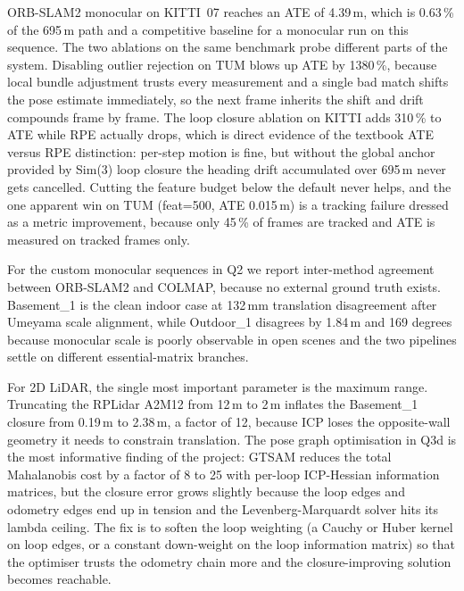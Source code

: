 \documentclass[twocolumn,10pt,a4paper]{article}
\begin{document}
ORB-SLAM2 monocular on KITTI~07 reaches an ATE of 4.39\,m, which is
0.63\,\% of the 695\,m path and a competitive baseline for a
monocular run on this sequence. The two ablations on the same
benchmark probe different parts of the system. Disabling outlier
rejection on TUM blows up ATE by 1380\,\%, because local bundle
adjustment trusts every measurement and a single bad match shifts
the pose estimate immediately, so the next frame inherits the shift
and drift compounds frame by frame. The loop closure ablation on
KITTI adds 310\,\% to ATE while RPE actually drops, which is direct
evidence of the textbook ATE versus RPE distinction: per-step motion
is fine, but without the global anchor provided by Sim(3) loop
closure the heading drift accumulated over 695\,m never gets
cancelled. Cutting the feature budget below the default never helps,
and the one apparent win on TUM (feat=500, ATE 0.015\,m) is a
tracking failure dressed as a metric improvement, because only 45\,\%
of frames are tracked and ATE is measured on tracked frames only.

For the custom monocular sequences in Q2 we report inter-method
agreement between ORB-SLAM2 and COLMAP, because no external ground
truth exists. Basement\_1 is the clean indoor case at 132\,mm
translation disagreement after Umeyama scale alignment, while
Outdoor\_1 disagrees by 1.84\,m and 169 degrees because monocular
scale is poorly observable in open scenes and the two pipelines
settle on different essential-matrix branches.

For 2D LiDAR, the single most important parameter is the maximum
range. Truncating the RPLidar A2M12 from 12\,m to 2\,m inflates the
Basement\_1 closure from 0.19\,m to 2.38\,m, a factor of 12, because
ICP loses the opposite-wall geometry it needs to constrain
translation. The pose graph optimisation in Q3d is the most
informative finding of the project: GTSAM reduces the total
Mahalanobis cost by a factor of 8 to 25 with per-loop ICP-Hessian
information matrices, but the closure error grows slightly because
the loop edges and odometry edges end up in tension and the
Levenberg-Marquardt solver hits its lambda ceiling. The fix is to
soften the loop weighting (a Cauchy or Huber kernel on loop edges, or
a constant down-weight on the loop information matrix) so that the
optimiser trusts the odometry chain more and the closure-improving
solution becomes reachable.
\end{document}
